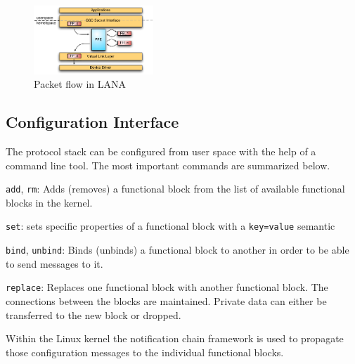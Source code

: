 \documentclass{sig-alternate}
\begin{document}

\begin{figure}
\centering
\includegraphics[width=0.4\textwidth]{figures/data_flow.pdf}
\caption{Packet flow in LANA}
\label{fig:architecture}
\vspace{-0.5cm}
\end{figure}

\subsection{Configuration Interface}
The protocol stack can be configured from user space with the help of a 
command line tool. The most important commands are summarized below.
\begin{compactitem}
\item \texttt{add}, \texttt{rm}: Adds (removes) a functional block from the 
      list of available functional blocks in the kernel. 
\item \texttt{set}: sets specific properties of a functional block with a 
      \texttt{key=value} semantic
\item \texttt{bind}, \texttt{unbind}: Binds (unbinds) a functional block 
      to another in order to be able to send messages to it. 
\item \texttt{replace}: Replaces one functional block with another 
      functional block. The connections between the blocks are maintained. 
      Private data can either be transferred to the new block or dropped.
\end{compactitem}
Within the Linux kernel the notification chain framework is used to propagate those configuration messages to the individual functional blocks. 
\end{document}
